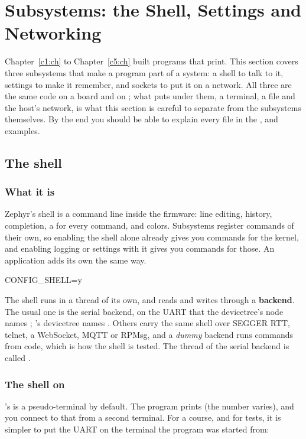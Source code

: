 
\section{Subsystems: the Shell, Settings and Networking}
\label{c6:sec:subsystemstheshell}\label{c6:app:a}
Chapter~\ref{c1:ch} to Chapter~\ref{c5:ch} built programs that print. This section covers three
subsystems that make a program part of a system: a shell to talk to it, settings to make it
remember, and sockets to put it on a network. All three are the same code on a board and on
; what  puts under them, a terminal, a file and the host’s
network, is what this section is careful to separate from the subsystems themselves. By the end you
should be able to explain every file in the ,
 and  examples.

\subsection{The shell}

\subsubsection{What it is}
Zephyr’s shell is a command line inside the firmware: line editing, history,  completion,
a  for every command, and colors. Subsystems register commands of their own, so enabling
the shell alone already gives you commands for the kernel, and enabling logging or settings with it
gives you commands for those. An application adds its own the same way.

\begin{kconfigcode}
CONFIG_SHELL=y
\end{kconfigcode}

The shell runs in a thread of its own, and reads and writes through a \textbf{backend}. The usual
one is the serial backend, on the UART that the devicetree’s  node names
; ’s devicetree names . Others carry the same
shell over SEGGER RTT, telnet, a WebSocket, MQTT or RPMsg, and a \emph{dummy} backend runs commands
from code, which is how the shell is tested. The thread of the serial backend is called
.

\subsubsection{The shell on }
’s  is a pseudo-terminal by default. The program prints  (the number varies), and you connect to that from a second
terminal. For a course, and for tests, it is simpler to put the UART on the terminal the program was
started from:

